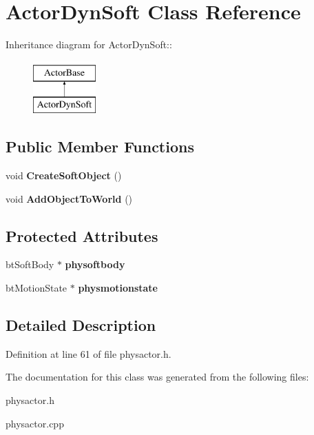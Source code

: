 \hypertarget{classActorDynSoft}{
\section{ActorDynSoft Class Reference}
\label{dc/de0/classActorDynSoft}
}
Inheritance diagram for ActorDynSoft::\begin{figure}[H]
\begin{center}
\leavevmode
\includegraphics[height=2cm]{dc/de0/classActorDynSoft}
\end{center}
\end{figure}
\subsection*{Public Member Functions}
\begin{DoxyCompactItemize}
\item 
\hypertarget{classActorDynSoft_a249bc0621b1d55ea0a9c7787605078d6}{
void {\bfseries CreateSoftObject} ()}
\label{dc/de0/classActorDynSoft_a249bc0621b1d55ea0a9c7787605078d6}

\item 
\hypertarget{classActorDynSoft_ac44b23c6a024656196a523732887164e}{
void {\bfseries AddObjectToWorld} ()}
\label{dc/de0/classActorDynSoft_ac44b23c6a024656196a523732887164e}

\end{DoxyCompactItemize}
\subsection*{Protected Attributes}
\begin{DoxyCompactItemize}
\item 
\hypertarget{classActorDynSoft_a9f5b3e1cfa400bb6095f77feb81e76d8}{
btSoftBody $\ast$ {\bfseries physoftbody}}
\label{dc/de0/classActorDynSoft_a9f5b3e1cfa400bb6095f77feb81e76d8}

\item 
\hypertarget{classActorDynSoft_aad9dfc6f0d3f08c8abd110c8c9175b97}{
btMotionState $\ast$ {\bfseries physmotionstate}}
\label{dc/de0/classActorDynSoft_aad9dfc6f0d3f08c8abd110c8c9175b97}

\end{DoxyCompactItemize}


\subsection{Detailed Description}


Definition at line 61 of file physactor.h.

The documentation for this class was generated from the following files:\begin{DoxyCompactItemize}
\item 
physactor.h\item 
physactor.cpp\end{DoxyCompactItemize}
